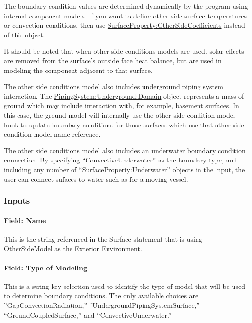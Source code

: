 The boundary condition values are determined dynamically by the program using internal component models. If you want to define other side surface temperatures or convection conditions, then use \hyperref[surfacepropertyothersidecoefficients]{SurfaceProperty:OtherSideCoefficients} instead of this object.

It should be noted that when other side conditions models are used, solar effects are removed from the surface's outside face heat balance, but are used in modeling the component adjacent to that surface.

The other side conditions model also includes underground piping system interaction. The \hyperref[pipingsystemundergrounddomain]{PipingSystem:Underground:Domain} object represents a mass of ground which may include interaction with, for example, basement surfaces. In this case, the ground model will internally use the other side condition model hook to update boundary conditions for those surfaces which use that other side condition model name reference.

The other side conditions model also includes an underwater boundary condition connection.  By specifying ``ConvectiveUnderwater'' as the boundary type, and including any number of ``\hyperref[surfacepropertyunderwater]{SurfaceProperty:Underwater}'' objects in the input, the user can connect sufaces to water such as for a moving vessel.

\subsubsection{Inputs}\label{inputs-5}

\paragraph{Field: Name}\label{field-name-4}

This is the string referenced in the Surface statement that is using OtherSideModel as the Exterior Environment.

\paragraph{Field: Type of Modeling}\label{field-type-of-modeling}

This is a string key selection used to identify the type of model that will be used to determine boundary conditions. The only available choices are ''GapConvectionRadiation,'' ``UndergroundPipingSystemSurface,'' ``GroundCoupledSurface,'' and ``ConvectiveUnderwater.''


